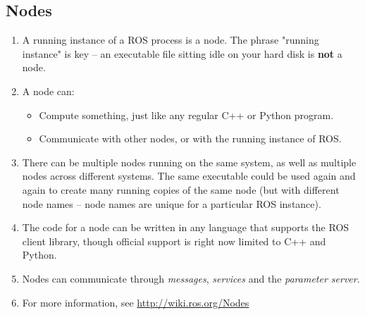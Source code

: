 \documentclass{article}
\begin{document}
        \subsection{Nodes}
            \begin{enumerate}
                \item A running instance of a ROS process is a node. The phrase "running instance" is key --
                an executable file sitting idle on your hard disk is \textbf{not} a node.
                \item A node can:
                \begin{itemize}
                    \item Compute something, just like any regular C++ or Python program.
                    \item Communicate with other nodes, or with the running instance of ROS.
                \end{itemize}
                \item There can be multiple nodes running on the same system, as well as multiple nodes across different systems. The same executable 
                could be used again and again to create many running copies of the same node (but with different node names -- node names are unique for a particular ROS instance).
                \item The code for a node can be written in any language that supports the ROS client library, though official support is right 
                now limited to C++ and Python.
                \item Nodes can communicate through \emph{messages}, \emph{services} and the \emph{parameter server}.
                \item For more information, see \url{http://wiki.ros.org/Nodes}
            \end{enumerate}
\end{document}
